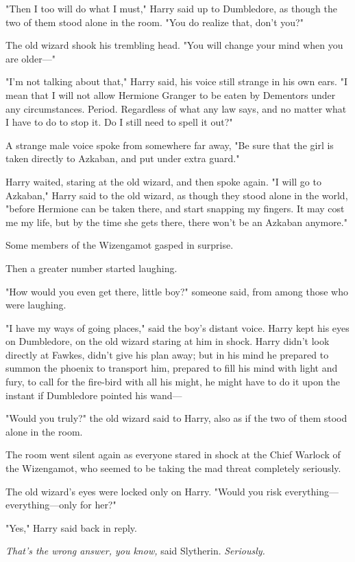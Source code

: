 "Then I too will do what I must," Harry said up to Dumbledore, as though the 
two of them stood alone in the room. "You do realize that, don't you?"

The old wizard shook his trembling head. "You will change your mind when you 
are older---"

"I'm not talking about that," Harry said, his voice still strange in his own 
ears. "I mean that I will not allow Hermione Granger to be eaten by Dementors 
under any circumstances. Period. Regardless of what any law says, and no matter 
what I have to do to stop it. Do I still need to spell it out?"

A strange male voice spoke from somewhere far away, "Be sure that the girl is 
taken directly to Azkaban, and put under extra guard."

Harry waited, staring at the old wizard, and then spoke again. "I will go to 
Azkaban," Harry said to the old wizard, as though they stood alone in the 
world, "before Hermione can be taken there, and start snapping my fingers. It 
may cost me my life, but by the time she gets there, there won't be an Azkaban 
anymore."

Some members of the Wizengamot gasped in surprise.

Then a greater number started laughing.

"How would you even get there, little boy?" someone said, from among those who 
were laughing.

"I have my ways of going places," said the boy's distant voice. Harry kept his 
eyes on Dumbledore, on the old wizard staring at him in shock. Harry didn't 
look directly at Fawkes, didn't give his plan away; but in his mind he prepared 
to summon the phoenix to transport him, prepared to fill his mind with light 
and fury, to call for the fire-bird with all his might, he might have to do it 
upon the instant if Dumbledore pointed his wand---

"Would you truly?" the old wizard said to Harry, also as if the two of them 
stood alone in the room.

The room went silent again as everyone stared in shock at the Chief Warlock of 
the Wizengamot, who seemed to be taking the mad threat completely seriously.

The old wizard's eyes were locked only on Harry. "Would you risk 
everything---everything---only for her?"

"Yes," Harry said back in reply.

\emph{That's the wrong answer, you know,} said Slytherin. \emph{Seriously.}

